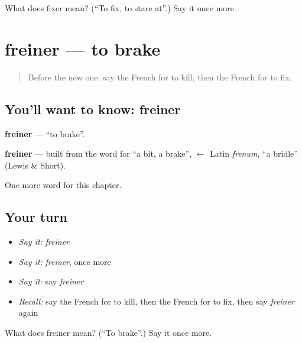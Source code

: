 \begin{tcolorbox}[breakable,colback=teal!4,colframe=teal!35!black,title={Before you move on}]
What does fixer mean? (\textquotedblleft{}To fix, to stare at\textquotedblright{}.) Say it once more.
\end{tcolorbox}
\section[freiner]{freiner — to brake}

\label{lesson:FR-C212-freiner}



\begin{quote}
Before the new one: say the French for to kill, then the French for to fix.
\end{quote}

\subsection*{You'll want to know: freiner}
\textbf{freiner} — \textquotedblleft{}to brake\textquotedblright{}.

\begin{cousinweb}
\textbf{freiner} — built from the word for \textquotedblleft{}a bit, a brake\textquotedblright{}, $\leftarrow$ Latin \emph{frenum}, \textquotedblleft{}a bridle\textquotedblright{} (Lewis \& Short).
\end{cousinweb}

\begin{grammarlens}[title={What you've built}]
One more word for this chapter.
\end{grammarlens}

\subsection*{Your turn}
\begin{itemize}
\raggedright
  \item \emph{Say it:} \emph{freiner}
  \item \emph{Say it:} \emph{freiner}, once more
  \item \emph{Say it:} say \emph{freiner}
  \item \emph{Recall:} say the French for to kill, then the French for to fix, then say \emph{freiner} again
\end{itemize}

\begin{tcolorbox}[breakable,colback=teal!4,colframe=teal!35!black,title={Before you move on}]
What does freiner mean? (\textquotedblleft{}To brake\textquotedblright{}.) Say it once more.
\end{tcolorbox}
